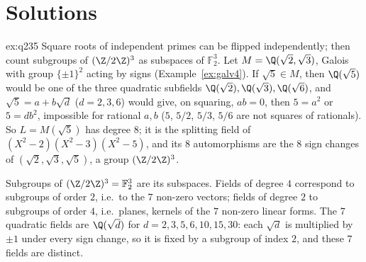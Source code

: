 \section{Solutions}

\begin{solution}{ex:q235}
\idea Square roots of independent primes can be flipped independently; then count subgroups of $(\Z/2\Z)^3$ as subspaces of $\mathbb F_2^3$.
\writeup Let $M=\Q(\sqrt2,\sqrt3)$, Galois with group $\{\pm1\}^2$ acting by signs (Example~\ref{ex:galv4}). If $\sqrt5\in M$, then $\Q(\sqrt5)$ would be one of the three quadratic subfields $\Q(\sqrt2),\Q(\sqrt3),\Q(\sqrt6)$, and $\sqrt5=a+b\sqrt d$ ($d=2,3,6$) would give, on squaring, $ab=0$, then $5=a^2$ or $5=db^2$, impossible for rational $a,b$ ($5$, $5/2$, $5/3$, $5/6$ are not squares of rationals). So $L=M(\sqrt5)$ has degree $8$; it is the splitting field of $(X^2-2)(X^2-3)(X^2-5)$, and its $8$ automorphisms are the $8$ sign changes of $(\sqrt2,\sqrt3,\sqrt5)$, a group $(\Z/2\Z)^3$.

Subgroups of $(\Z/2\Z)^3=\mathbb F_2^3$ are its subspaces. Fields of degree $4$ correspond to subgroups of order $2$, i.e.\ to the $7$ non-zero vectors; fields of degree $2$ to subgroups of order $4$, i.e.\ planes, kernels of the $7$ non-zero linear forms. The $7$ quadratic fields are $\Q(\sqrt d)$ for $d=2,3,5,6,10,15,30$: each $\sqrt d$ is multiplied by $\pm1$ under every sign change, so it is fixed by a subgroup of index $2$, and these $7$ fields are distinct.
\end{solution}

